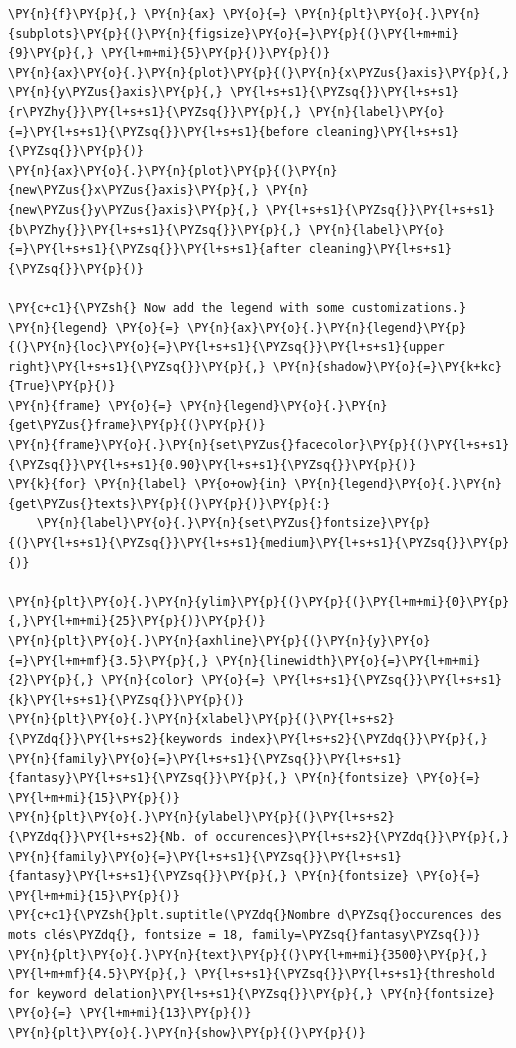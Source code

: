 \begin{tcolorbox}[breakable, size=fbox, boxrule=1pt, pad at break*=1mm,colback=cellbackground, colframe=cellborder]
\begin{Verbatim}[commandchars=\\\{\}]
\PY{n}{f}\PY{p}{,} \PY{n}{ax} \PY{o}{=} \PY{n}{plt}\PY{o}{.}\PY{n}{subplots}\PY{p}{(}\PY{n}{figsize}\PY{o}{=}\PY{p}{(}\PY{l+m+mi}{9}\PY{p}{,} \PY{l+m+mi}{5}\PY{p}{)}\PY{p}{)}
\PY{n}{ax}\PY{o}{.}\PY{n}{plot}\PY{p}{(}\PY{n}{x\PYZus{}axis}\PY{p}{,} \PY{n}{y\PYZus{}axis}\PY{p}{,} \PY{l+s+s1}{\PYZsq{}}\PY{l+s+s1}{r\PYZhy{}}\PY{l+s+s1}{\PYZsq{}}\PY{p}{,} \PY{n}{label}\PY{o}{=}\PY{l+s+s1}{\PYZsq{}}\PY{l+s+s1}{before cleaning}\PY{l+s+s1}{\PYZsq{}}\PY{p}{)}
\PY{n}{ax}\PY{o}{.}\PY{n}{plot}\PY{p}{(}\PY{n}{new\PYZus{}x\PYZus{}axis}\PY{p}{,} \PY{n}{new\PYZus{}y\PYZus{}axis}\PY{p}{,} \PY{l+s+s1}{\PYZsq{}}\PY{l+s+s1}{b\PYZhy{}}\PY{l+s+s1}{\PYZsq{}}\PY{p}{,} \PY{n}{label}\PY{o}{=}\PY{l+s+s1}{\PYZsq{}}\PY{l+s+s1}{after cleaning}\PY{l+s+s1}{\PYZsq{}}\PY{p}{)}

\PY{c+c1}{\PYZsh{} Now add the legend with some customizations.}
\PY{n}{legend} \PY{o}{=} \PY{n}{ax}\PY{o}{.}\PY{n}{legend}\PY{p}{(}\PY{n}{loc}\PY{o}{=}\PY{l+s+s1}{\PYZsq{}}\PY{l+s+s1}{upper right}\PY{l+s+s1}{\PYZsq{}}\PY{p}{,} \PY{n}{shadow}\PY{o}{=}\PY{k+kc}{True}\PY{p}{)}
\PY{n}{frame} \PY{o}{=} \PY{n}{legend}\PY{o}{.}\PY{n}{get\PYZus{}frame}\PY{p}{(}\PY{p}{)}
\PY{n}{frame}\PY{o}{.}\PY{n}{set\PYZus{}facecolor}\PY{p}{(}\PY{l+s+s1}{\PYZsq{}}\PY{l+s+s1}{0.90}\PY{l+s+s1}{\PYZsq{}}\PY{p}{)}
\PY{k}{for} \PY{n}{label} \PY{o+ow}{in} \PY{n}{legend}\PY{o}{.}\PY{n}{get\PYZus{}texts}\PY{p}{(}\PY{p}{)}\PY{p}{:}
    \PY{n}{label}\PY{o}{.}\PY{n}{set\PYZus{}fontsize}\PY{p}{(}\PY{l+s+s1}{\PYZsq{}}\PY{l+s+s1}{medium}\PY{l+s+s1}{\PYZsq{}}\PY{p}{)}
            
\PY{n}{plt}\PY{o}{.}\PY{n}{ylim}\PY{p}{(}\PY{p}{(}\PY{l+m+mi}{0}\PY{p}{,}\PY{l+m+mi}{25}\PY{p}{)}\PY{p}{)}
\PY{n}{plt}\PY{o}{.}\PY{n}{axhline}\PY{p}{(}\PY{n}{y}\PY{o}{=}\PY{l+m+mf}{3.5}\PY{p}{,} \PY{n}{linewidth}\PY{o}{=}\PY{l+m+mi}{2}\PY{p}{,} \PY{n}{color} \PY{o}{=} \PY{l+s+s1}{\PYZsq{}}\PY{l+s+s1}{k}\PY{l+s+s1}{\PYZsq{}}\PY{p}{)}
\PY{n}{plt}\PY{o}{.}\PY{n}{xlabel}\PY{p}{(}\PY{l+s+s2}{\PYZdq{}}\PY{l+s+s2}{keywords index}\PY{l+s+s2}{\PYZdq{}}\PY{p}{,} \PY{n}{family}\PY{o}{=}\PY{l+s+s1}{\PYZsq{}}\PY{l+s+s1}{fantasy}\PY{l+s+s1}{\PYZsq{}}\PY{p}{,} \PY{n}{fontsize} \PY{o}{=} \PY{l+m+mi}{15}\PY{p}{)}
\PY{n}{plt}\PY{o}{.}\PY{n}{ylabel}\PY{p}{(}\PY{l+s+s2}{\PYZdq{}}\PY{l+s+s2}{Nb. of occurences}\PY{l+s+s2}{\PYZdq{}}\PY{p}{,} \PY{n}{family}\PY{o}{=}\PY{l+s+s1}{\PYZsq{}}\PY{l+s+s1}{fantasy}\PY{l+s+s1}{\PYZsq{}}\PY{p}{,} \PY{n}{fontsize} \PY{o}{=} \PY{l+m+mi}{15}\PY{p}{)}
\PY{c+c1}{\PYZsh{}plt.suptitle(\PYZdq{}Nombre d\PYZsq{}occurences des mots clés\PYZdq{}, fontsize = 18, family=\PYZsq{}fantasy\PYZsq{})}
\PY{n}{plt}\PY{o}{.}\PY{n}{text}\PY{p}{(}\PY{l+m+mi}{3500}\PY{p}{,} \PY{l+m+mf}{4.5}\PY{p}{,} \PY{l+s+s1}{\PYZsq{}}\PY{l+s+s1}{threshold for keyword delation}\PY{l+s+s1}{\PYZsq{}}\PY{p}{,} \PY{n}{fontsize} \PY{o}{=} \PY{l+m+mi}{13}\PY{p}{)}
\PY{n}{plt}\PY{o}{.}\PY{n}{show}\PY{p}{(}\PY{p}{)}
\end{Verbatim}
\end{tcolorbox}

